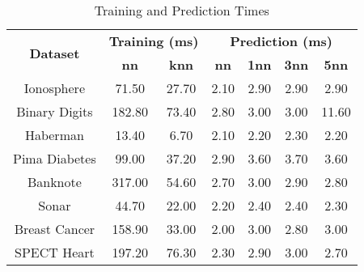 \begin{table}[htbp]
\caption{Training and Prediction Times}
\begin{center}
\begin{tabular}{|c|c|c|c|c|c|c|}
\hline
\multirow{2}{*}{\textbf{Dataset}} & \multicolumn{2}{c|}{\textbf{Training (ms)}} & \multicolumn{4}{c|}{\textbf{Prediction (ms)}} \\ \cline{2-7}
 & \textbf{nn} & \textbf{knn} & \textbf{nn} & \textbf{1nn} & \textbf{3nn} & \textbf{5nn} \\ \hline
Ionosphere & 71.50 & 27.70 & 2.10 & 2.90 & 2.90 & 2.90 \\ \hline
Binary Digits & 182.80 & 73.40 & 2.80 & 3.00 & 3.00 & 11.60 \\ \hline
Haberman & 13.40 & 6.70 & 2.10 & 2.20 & 2.30 & 2.20 \\ \hline
Pima Diabetes & 99.00 & 37.20 & 2.90 & 3.60 & 3.70 & 3.60 \\ \hline
Banknote & 317.00 & 54.60 & 2.70 & 3.00 & 2.90 & 2.80 \\ \hline
Sonar & 44.70 & 22.00 & 2.20 & 2.40 & 2.40 & 2.30 \\ \hline
Breast Cancer & 158.90 & 33.00 & 2.00 & 3.00 & 2.80 & 3.00 \\ \hline
SPECT Heart & 197.20 & 76.30 & 2.30 & 2.90 & 3.00 & 2.70 \\ \hline
\end{tabular}
\label{tab:timing}
\end{center}
\end{table}